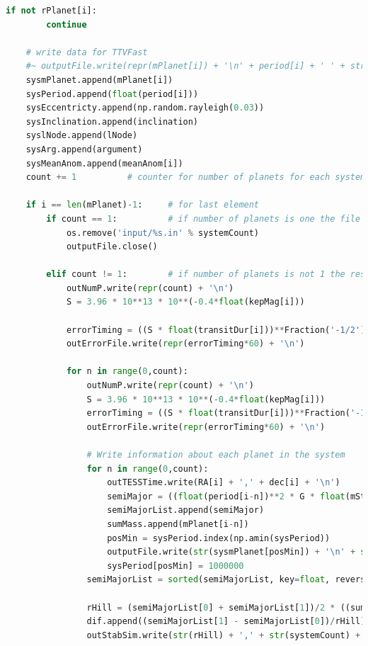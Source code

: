\documentclass[12pt]{report}
\begin{document}
\begin{appendix}
\begin{lstlisting}[language=Python]
	if not rPlanet[i]:
		continue

	# write data for TTVFast
	#~ outputFile.write(repr(mPlanet[i]) + '\n' + period[i] + ' ' + str(np.random.rayleigh(0.03)) + ' ' + repr(inclination) + ' ' + repr(lNode) + '  ' + str(np.random.uniform(0,360)) + ' ' + repr(meanAnom[i]) + '\n') 
	sysmPlanet.append(mPlanet[i])
	sysPeriod.append(float(period[i]))
	sysEccentricty.append(np.random.rayleigh(0.03))
	sysInclination.append(inclination)
	syslNode.append(lNode)
	sysArg.append(argument)
	sysMeanAnom.append(meanAnom[i])
	count += 1			# counter for number of planets for each system
	
	if i == len(mPlanet)-1: 	# for last element
		if count == 1:			# if number of planets is one the file is removed
			os.remove('input/%s.in' % systemCount)
			outputFile.close()	
	
		elif count != 1: 		# if number of planets is not 1 the rest of the data is saved and a new file is created
			outNumP.write(repr(count) + '\n')
			S = 3.96 * 10**13 * 10**(-0.4*float(kepMag[i]))			
			
			errorTiming = ((S * float(transitDur[i]))**Fraction('-1/2') * ((float(rPlanet[i])*0.009158)/float(rStar[i]))**Fraction('-3/2') * float(transitDur[i]))		
			outErrorFile.write(repr(errorTiming*60) + '\n') 		
			
			for n in range(0,count):
				outNumP.write(repr(count) + '\n')
				S = 3.96 * 10**13 * 10**(-0.4*float(kepMag[i]))			
				errorTiming = ((S * float(transitDur[i]))**Fraction('-1/2') * ((float(rPlanet[i])*0.009158)/float(rStar[i]))**Fraction('-3/2') * float(transitDur[i]))		
				outErrorFile.write(repr(errorTiming*60) + '\n') 		
				
				# Write information about each planet in the system
				for n in range(0,count):
					outTESSTime.write(RA[i] + ',' + dec[i] + '\n')
					semiMajor = ((float(period[i-n])**2 * G * float(mStar[i]))/(4 * math.pi**2))**Fraction('1/3')
					semiMajorList.append(semiMajor)
					sumMass.append(mPlanet[i-n])
					posMin = sysPeriod.index(np.amin(sysPeriod))
					outputFile.write(str(sysmPlanet[posMin]) + '\n' + str(sysPeriod[posMin]) + ' ' + repr(sysEccentricty[posMin]) + ' ' + repr(sysInclination[posMin]) + ' ' + repr(syslNode[posMin]) + '  ' + repr(sysArg[posMin]) + ' ' + repr(sysMeanAnom[posMin]) + '\n')
					sysPeriod[posMin] = 1000000
				semiMajorList = sorted(semiMajorList, key=float, reverse=False)
				
				rHill = (semiMajorList[0] + semiMajorList[1])/2 * ((sumMass[0] + sumMass[1])/(3*float(mStar[i]))**Fraction('1/3'))
				dif.append((semiMajorList[1] - semiMajorList[0])/rHill)
				outStabSim.write(str(rHill) + ',' + str(systemCount) +  '\n')
				

\end{lstlisting}
\end{appendix}
\end{document}
